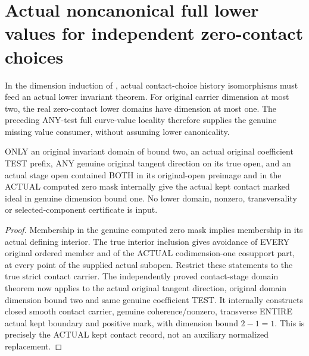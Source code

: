 \section{Actual noncanonical full lower values for independent zero-contact choices}

In the dimension induction of \cite[Section~5, Step~I.B]{bierstone-milman08-functoriality},
actual contact-choice history isomorphisms must feed an actual lower
invariant theorem. For original carrier dimension at most two, the real
zero-contact lower domains have dimension at most one. The preceding
ANY-test full curve-value locality therefore supplies the genuine missing
value consumer, without assuming lower canonicality.

\begin{lemma}
\label{hir:original-zero-mask-subopen-contact-curve-domain}
\leanok
ONLY an original invariant domain of bound two, an actual original
coefficient TEST prefix, ANY genuine original tangent direction on its
true open, and an actual stage open contained BOTH in its original-open
preimage and in the ACTUAL computed zero mask internally give the actual
kept contact marked ideal in genuine dimension bound one. No lower
domain, nonzero, transversality or selected-component certificate is input.
\end{lemma}
\begin{proof}
Membership in the genuine computed zero mask implies membership in its
actual defining interior. The true interior inclusion gives avoidance of
EVERY original ordered member and of the ACTUAL codimension-one cosupport
part, at every point of the supplied actual subopen. Restrict these
statements to the true strict contact carrier. The independently proved
contact-stage domain theorem now applies to the actual original tangent
direction, original domain dimension bound two and same genuine coefficient
TEST. It internally constructs closed smooth contact carrier, genuine
coherence/nonzero, transverse ENTIRE actual kept boundary and positive
mark, with dimension bound $2-1=1$. This is precisely the ACTUAL kept
contact record, not an auxiliary normalized replacement.
\end{proof}

